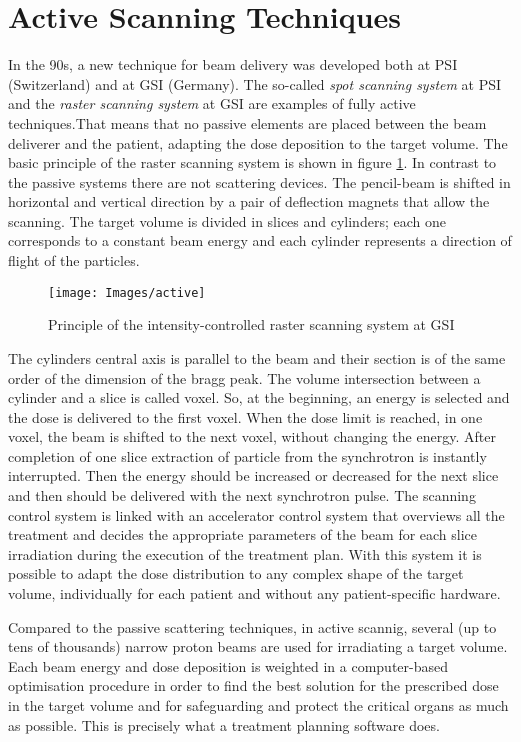 \documentclass[12pt, a4paper, twoside]{book}
\begin{document}
\section{Active Scanning Techniques}
\label{activeScanning}
In the 90s, a new technique for beam delivery was developed both at PSI (Switzerland) and at GSI (Germany). The so-called \emph{spot scanning system} at PSI and the \emph{raster scanning system} at GSI are examples of  fully active techniques.That means that no passive elements are placed between the beam deliverer and the patient, adapting the dose deposition to the target volume. The basic principle of the raster scanning system is shown in figure \ref{fig:active}.
In contrast to the passive systems there are not scattering devices. The pencil-beam is shifted in horizontal and vertical direction by a pair of deflection magnets that allow the scanning. The target volume is divided in slices and cylinders; each one corresponds to a constant beam energy and each cylinder represents a direction of flight of the particles.
\begin{figure}[!b]
{\texttt{[image: Images/active]}}
\caption{Principle of the intensity-controlled raster scanning system at GSI \cite{hab:scan}}
\label{fig:active}
\end{figure}
The cylinders central axis is parallel to the beam and their section is of the same order of the dimension of the bragg peak. The volume intersection between a cylinder and a slice is called voxel.
So, at the beginning, an energy is selected and the dose is delivered to the first voxel.
When the dose limit is reached, in one voxel, the beam is shifted to the next voxel, without changing the energy. After completion of one slice extraction of particle from the synchrotron is instantly interrupted. Then the energy should be increased or decreased for the next slice and then should be delivered with the next synchrotron pulse. The scanning control system is linked with an accelerator control system that overviews all the treatment and decides the appropriate parameters of the beam for each slice irradiation during the execution of the treatment plan. 
With this system it is possible to adapt the dose distribution to any complex shape of the target volume, individually for each patient and without any patient-specific hardware.

Compared to the passive scattering techniques, in active scannig, several (up to tens of thousands) narrow proton beams are used for irradiating a target volume. Each beam energy and dose deposition is weighted in a computer-based optimisation procedure in order to find the best solution for the prescribed dose in the target volume and for safeguarding and protect the critical organs as much as possible.
This is precisely what a treatment planning software does.
\end{document}
